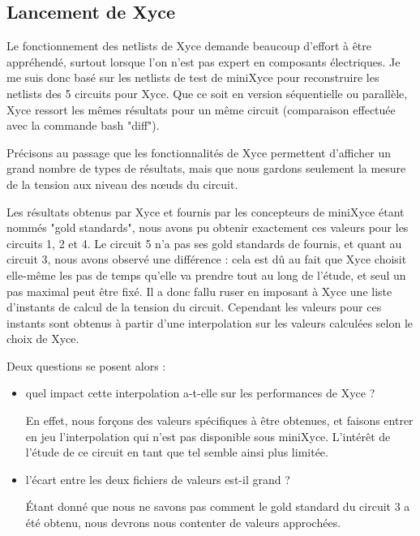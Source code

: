 \documentclass[11pt,a4paper,oneside]{memoir}
\theoremstyle{definition}
\theoremstyle{remark}
\theoremstyle{plain}
\begin{document}
\subsection{Lancement de Xyce}

Le fonctionnement des netlists de Xyce demande beaucoup d'effort à être appréhendé, surtout lorsque l'on n'est pas expert en composants électriques. Je me suis donc basé sur les netlists de test de miniXyce pour reconstruire les netlists des 5 circuits pour Xyce. Que ce soit en version séquentielle ou parallèle, Xyce ressort les mêmes résultats pour un même circuit (comparaison effectuée avec la commande bash "diff").

Précisons au passage que les fonctionnalités de Xyce permettent d'afficher un grand nombre de types de résultats, mais que nous gardons seulement la mesure de la tension aux niveau des nœuds du circuit.

Les résultats obtenus par Xyce et fournis par les concepteurs de miniXyce étant nommés "gold standards", nous avons pu obtenir exactement ces valeurs pour les circuits 1, 2 et 4. Le circuit 5 n'a pas ses gold standards de fournis, et quant au circuit 3, nous avons observé une différence : cela est dû au fait que Xyce choisit elle-même les pas de temps qu'elle va prendre tout au long de l'étude, et seul un pas maximal peut être fixé. Il a donc fallu ruser en imposant à Xyce une liste d'instants de calcul de la tension du circuit. Cependant les valeurs pour ces instants sont obtenus à partir d'une interpolation sur les valeurs calculées selon le choix de Xyce.

Deux questions se posent alors :
\begin{itemize}
\item quel impact cette interpolation a-t-elle sur les performances de Xyce ?

En effet, nous forçons des valeurs spécifiques à être obtenues, et faisons entrer en jeu l'interpolation qui n'est pas disponible sous miniXyce. L'intérêt de l'étude de ce circuit en tant que tel semble ainsi plus limitée.
\item l'écart entre les deux fichiers de valeurs est-il grand ?

\'Etant donné que nous ne savons pas comment le gold standard du circuit 3 a été obtenu, nous devrons nous contenter de valeurs approchées.
\end{itemize}
\end{document}
